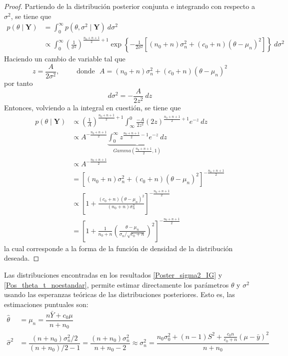 \documentclass[10pt,openright]{book}\usepackage[]{graphicx}\usepackage[]{color}
\begin{document}
\begin{proof}
Partiendo de la distribuci\'on posterior conjunta e integrando con respecto a $\sigma^2$, se tiene que
\begin{align*}
p(\theta \mid \mathbf{Y})&= \int_0^{\infty} p(\theta,\sigma^2 \mid \mathbf{Y}) \ d\sigma^2 \\
&\propto \int_0^{\infty} \left(\frac{1}{\sigma^2}\right)^{\frac{n_0+n+1}{2}+1}
\exp\left\{-\frac{1}{2\sigma^2}\left[(n_0+n)\sigma^2_n+(c_0+n)(\theta-\mu_n)^2\right]\right\} \ d\sigma^2
\end{align*}
Haciendo un cambio de variable tal que
\begin{equation*}
z=\frac{A}{2\sigma^2}, \ \ \ \ \ \ \ \ \ \ \ \text{donde} \ \ \ A=(n_0+n)\sigma^2_n+(c_0+n)(\theta-\mu_n)^2
\end{equation*}
por tanto
\begin{equation*}
d\sigma^2=-\frac{A}{2z^2} \ dz
\end{equation*}
Entonces, volviendo a la integral en cuesti\'on, se tiene que
\begin{align*}
p(\theta \mid \mathbf{Y})& \propto
\left(\frac{1}{A}\right)^{\frac{n_0+n+1}{2}+1}\int_{\infty}^{0} \frac{-A}{2z^2} (2z)^{\frac{n_0+n+1}{2}+1}e^{-z} \ dz \\
&\propto A^{-\frac{n_0+n+1}{2}}\underbrace{\int_{0}^{\infty} z^{\frac{n_0+n+1}{2}-1}e^{-z}\ dz}_{Gamma\left(\frac{n_0+n+1}{2},1\right)}\\
&\propto A^{-\frac{n_0+n+1}{2}}\\
&= \left[(n_0+n)\sigma^2_n+(c_0+n)(\theta-\mu_n)^2\right]^{-\frac{n_0+n+1}{2}}\\
&\propto \left[1+\frac{(c_0+n)(\theta-\mu_n)^2}{(n_0+n)\sigma^2_n}\right]^{-\frac{n_0+n+1}{2}}\\
&=\left[1+\frac{1}{n_0+n}\left(\frac{\theta-\mu_n}{\sigma_n/\sqrt{c_0+n}}\right)^2\right]^{-\frac{n_0+n+1}{2}}
\end{align*}
la cual corresponde a la forma de la funci\'on de densidad de la distribuci\'on deseada.
\end{proof}

Las distribuciones encontradas en los resultados \ref{Poster_sigma2_IG} y \ref{Pos_theta_t_noestandar}, permite estimar directamente los par\'ametros $\theta$ y $\sigma^2$ usando las esperanzas te\'oricas de las distribuciones posteriores. Esto es, las estimaciones puntuales son:
\begin{align*}
\hat{\theta}&=\mu_n=\dfrac{n\bar{Y}+c_0\mu}{n+n_0}\\
\hat{\sigma}^2&=\dfrac{(n+n_0)\sigma^2_n/2}{(n+n_0)/2-1}=\dfrac{(n+n_0)\sigma^2_n}{n+n_0-2}\approx\sigma^2_n=\dfrac{n_0\sigma^2_0+(n-1)S^2+\frac{c_0n}{c_0+n}(\mu-\bar{y})^2}{n+n_0}
\end{align*}
\end{document}
